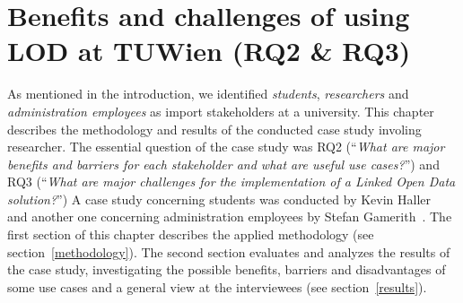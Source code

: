 \section{Benefits and challenges of using LOD at TUWien (RQ2 \& RQ3)}
As mentioned in the introduction, we identified \textit{students}, \textit{researchers} and \textit{administration employees} as import stakeholders at a university. This chapter describes the methodology and results of the conducted case study involing researcher. The essential question of the case study was RQ2 (``\textit{What are major benefits and barriers for each stakeholder and what are useful use cases?}'') and RQ3 (``\textit{What are major challenges for the implementation of a Linked Open Data solution?}'') 
A case study concerning students was conducted by Kevin Haller~\cite{article:haller_publishing_2016} and another one concerning administration employees by Stefan Gamerith~\cite{article:gamerith_publishing_2016}.
The first section of this chapter describes the applied methodology (see section~\ref{methodology}). The second section evaluates and analyzes the results of the case study, investigating the possible benefits, barriers and disadvantages of some use cases and a general view at the interviewees (see section~\ref{results}).

\newpage

